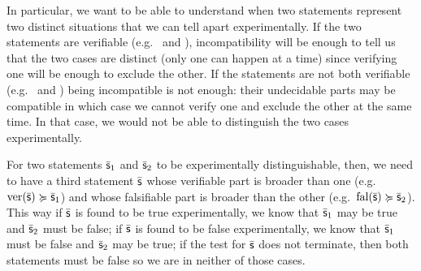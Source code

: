 \documentclass[11pt,letterpaper,fleqn]{memoir} %
\begin{document}
In particular, we want to be able to understand when two statements represent two distinct situations that we can tell apart experimentally. If the two statements are verifiable (e.g.~ and ), incompatibility will be enough to tell us that the two cases are distinct (only one can happen at a time) since verifying one will be enough to exclude the other. If the statements are not both verifiable (e.g.~ and ) being incompatible is not enough: their undecidable parts may be compatible in which case we cannot verify one and exclude the other at the same time. In that case, we would not be able to distinguish the two cases experimentally.

For two statements $\bar{\mathsf{s}}_1$ and $\bar{\mathsf{s}}_2$ to be experimentally distinguishable, then, we need to have a third statement $\bar{\mathsf{s}}$ whose verifiable part is broader than one (e.g.~$\operatorname{ver}(\bar{\mathsf{s}}) \succcurlyeq \bar{\mathsf{s}}_1$) and whose falsifiable part is broader than the other (e.g.~$\operatorname{fal}(\bar{\mathsf{s}}) \succcurlyeq \bar{\mathsf{s}}_2$). This way if $\bar{\mathsf{s}}$ is found to be true experimentally, we know that $\bar{\mathsf{s}}_1$ may be true and $\bar{\mathsf{s}}_2$ must be false; if $\bar{\mathsf{s}}$ is found to be false experimentally, we know that $\bar{\mathsf{s}}_1$ must be false and $\bar{\mathsf{s}}_2$ may be true; if the test for $\bar{\mathsf{s}}$ does not terminate, then both statements must be false so we are in neither of those cases.
\end{document}
